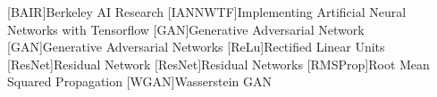 \documentclass[fleqn,10pt]{SelfArx} %
\begin{document}




\begin{acronym}
[BAIR]{Berkeley AI Research}
[IANNWTF]{Implementing Artificial Neural Networks with Tensorflow}
[GAN]{Generative Adversarial Network}
[GAN]{Generative Adversarial Networks}
[ReLu]{Rectified Linear Units}
[ResNet]{Residual Network}
[ResNet]{Residual Networks}
[RMSProp]{Root Mean Squared Propagation}
[WGAN]{Wasserstein \ac{GAN}}
\end{acronym}

\end{document}

